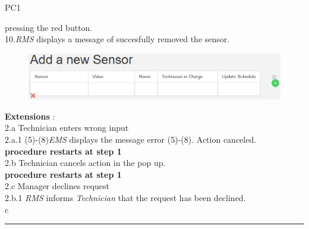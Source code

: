 \begin{lyxlist}{PC1}
{pressing the red button.\\
10.\emph{RMS} displays a message of succesfully removed the sensor.
 \begin{figure}
\includegraphics[width=1\textwidth]{images/AddANewSensor.eps}
\end{figure} 
\item [\textbf{Extensions}]:\\
2.a Technician enters wrong input\\
\hspace*{0.5cm} 2.a.1 (5)-(8)\emph{EMS} displays the message error (5)-(8).
Action canceled.\\
\hspace*{0.5cm} \textbf{procedure restarts at step 1}\\
2.b Technician cancels action in the pop up.\\
\hspace*{0.5cm} \textbf{procedure restarts at step 1}\\
2.c Manager declines request\\
\hspace*{0.5cm} 2.b.1 \emph{RMS} informs \emph{Technician} that the request
has been declined.\\
c
}
\end{lyxlist}
\hrule
\vspace{0.5cm}

\break


